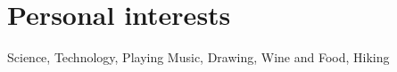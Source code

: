 \ifextended
  \section{Personal interests}

  Science, Technology, Playing Music, Drawing, Wine and Food, Hiking
\fi